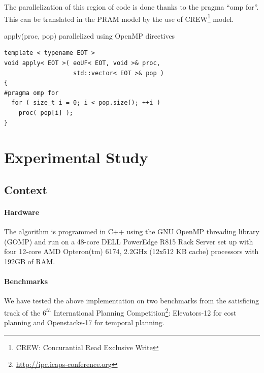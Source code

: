 \documentclass{sig-alternate}
\begin{document}
The parallelization of this region of code is done thanks to the pragma ``omp for''. This can be translated in the PRAM model by the use of CREW\footnote{CREW: Concurantial Read Exclusive Write} model.



\vspace{-0.2cm}
\begin{algorithm}[h!]
\caption{apply(proc, pop) parallelized using OpenMP directives}
\vspace{0.2cm}
\begin{verbatim}
template < typename EOT >
void apply< EOT >( eoUF< EOT, void >& proc,
                   std::vector< EOT >& pop )
{
#pragma omp for
  for ( size_t i = 0; i < pop.size(); ++i )
    proc( pop[i] );
}
\end{verbatim}
\end{algorithm}
\vspace{-0.2cm}

\section{Experimental Study}

\subsection{Context}

\paragraph{Hardware} %
The algorithm is programmed in C++ using the GNU OpenMP threading library (GOMP) and run on a 48-core DELL PowerEdge R815 Rack Server set up with four 12-core AMD Opteron(tm) 6174, 2.2GHz (12x512 KB cache) processors with 192GB of RAM.

\paragraph{Benchmarks} %
We have tested the above implementation on two benchmarks from the satisficing track of the $6^{th}$ International Planning Competition\footnote{\url{http://ipc.icaps-conference.org}}: Elevators-12 for cost planning and Openstacks-17 for temporal planning.
\end{document}
